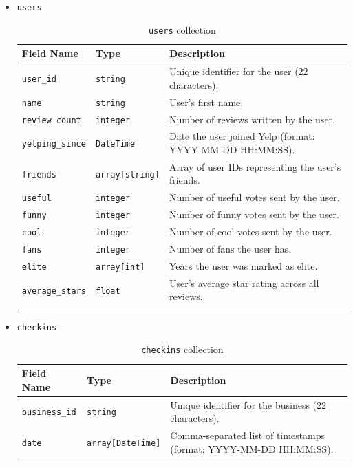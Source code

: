\documentclass{Configuration_Files/PoliMi3i_thesis}
\begin{document}
\begin{itemize}
\item{\texttt{users}}
\begin{longtable}{|p{3cm}|p{3.5cm}|p{10cm}|}
\hline
\textbf{Field Name} & \textbf{Type} & \textbf{Description} \\ \hline
\texttt{user\_id} & \texttt{string} & Unique identifier for the user (22 characters). \\ \hline
\texttt{name} & \texttt{string} & User's first name. \\ \hline
\texttt{review\_count} & \texttt{integer} & Number of reviews written by the user. \\ \hline
\texttt{yelping\_since} & \texttt{DateTime} & Date the user joined Yelp (format: YYYY-MM-DD HH:MM:SS).\\ \hline
\texttt{friends} & \texttt{array[string]} & Array of user IDs representing the user's friends. \\ \hline
\texttt{useful} & \texttt{integer} & Number of useful votes sent by the user. \\ \hline
\texttt{funny} & \texttt{integer} & Number of funny votes sent by the user. \\ \hline
\texttt{cool} & \texttt{integer} & Number of cool votes sent by the user. \\ \hline
\texttt{fans} & \texttt{integer} & Number of fans the user has. \\ \hline
\texttt{elite} & \texttt{array[int]} & Years the user was marked as elite. \\ \hline
\texttt{average\_stars} & \texttt{float} & User's average star rating across all reviews. \\ \hline
\caption{\texttt{users} collection}
\end{longtable}

\item{\texttt{checkins}}
\begin{longtable}{|p{3cm}|p{3.5cm}|p{10cm}|}
\hline
\textbf{Field Name} & \textbf{Type} & \textbf{Description} \\ \hline
\texttt{business\_id} & \texttt{string} & Unique identifier for the business (22 characters). \\ \hline
\texttt{date} & \texttt{array[DateTime]} & Comma-separated list of timestamps (format: YYYY-MM-DD HH:MM:SS). \\ \hline
\caption{\texttt{checkins} collection}
\end{longtable}

\end{itemize}
\end{document}
